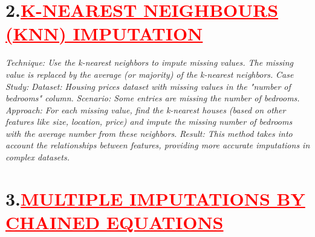 \documentclass[12pt]{article}
\begin{document}
\section*{\textbf{2.\hspace{0.25cm}\textcolor{red}{\underline{\Large{K-NEAREST NEIGHBOURS (KNN) IMPUTATION}}}}}
\hspace{1cm}\large{\emph{Technique: Use the k-nearest neighbors to impute missing values. The missing value is replaced by the average (or majority) of the k-nearest neighbors.}}\vspace{0.25cm}\newline
\hspace{1cm}\large{\emph{Case Study:}}\vspace{0.25cm}\newline
\hspace{1cm}\large{\emph{Dataset: Housing prices dataset with missing values in the "number of bedrooms" column.}}\vspace{0.25cm}\newline
\hspace{1cm}\large{\emph{Scenario: Some entries are missing the number of bedrooms.}}\vspace{0.25cm}\newpage
\hspace{1cm}\large{\emph{Approach: For each missing value, find the k-nearest houses (based on other features like size, location, price) and impute the missing number of bedrooms with the average number from these neighbors.}}\vspace{0.25cm}\newline
\hspace{1cm}\large{\emph{Result: This method takes into account the relationships between features, providing more accurate imputations in complex datasets.}}\vspace{1cm}\newline
\section*{\textbf{\hspace{1cm}3.\hspace{0.25cm}\textcolor{red}{\underline{\large{MULTIPLE IMPUTATIONS BY CHAINED EQUATIONS}}}}}
\end{document}
